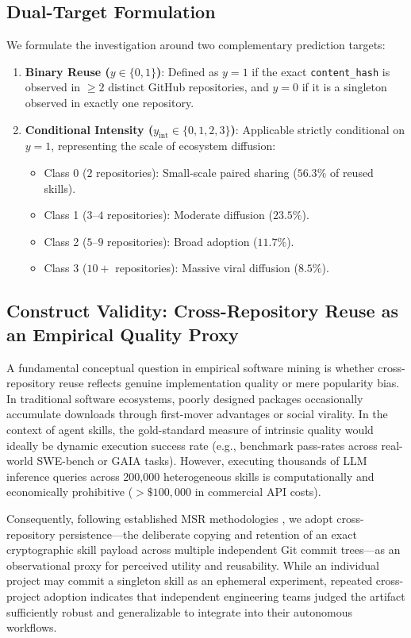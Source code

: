 \documentclass[12pt]{article}
\begin{document}
\subsection{Dual-Target Formulation}
We formulate the investigation around two complementary prediction targets:
\begin{enumerate}
    \item \textbf{Binary Reuse ($y \in \{0, 1\}$)}: Defined as $y = 1$ if the exact \texttt{content\_hash} is observed in $\ge 2$ distinct GitHub repositories, and $y = 0$ if it is a singleton observed in exactly one repository.
    \item \textbf{Conditional Intensity ($y_{\text{int}} \in \{0, 1, 2, 3\}$)}: Applicable strictly conditional on $y = 1$, representing the scale of ecosystem diffusion:
    \begin{itemize}
        \item Class 0 ($2$ repositories): Small-scale paired sharing ($56.3\%$ of reused skills).
        \item Class 1 ($3$--$4$ repositories): Moderate diffusion ($23.5\%$).
        \item Class 2 ($5$--$9$ repositories): Broad adoption ($11.7\%$).
        \item Class 3 ($10+$ repositories): Massive viral diffusion ($8.5\%$).
    \end{itemize}
\end{enumerate}

\subsection{Construct Validity: Cross-Repository Reuse as an Empirical Quality Proxy}
A fundamental conceptual question in empirical software mining is whether cross-repository reuse reflects genuine implementation quality or mere popularity bias. In traditional software ecosystems, poorly designed packages occasionally accumulate downloads through first-mover advantages or social virality. In the context of agent skills, the gold-standard measure of intrinsic quality would ideally be dynamic execution success rate (e.g., benchmark pass-rates across real-world SWE-bench or GAIA tasks). However, executing thousands of LLM inference queries across 200,000 heterogeneous skills is computationally and economically prohibitive ($> \$100,000$ in commercial API costs).

Consequently, following established MSR methodologies \cite{mockus2002two,haefliger2008code,lopes2017dejavu}, we adopt cross-repository persistence---the deliberate copying and retention of an exact cryptographic skill payload across multiple independent Git commit trees---as an observational proxy for perceived utility and reusability. While an individual project may commit a singleton skill as an ephemeral experiment, repeated cross-project adoption indicates that independent engineering teams judged the artifact sufficiently robust and generalizable to integrate into their autonomous workflows.
\end{document}
